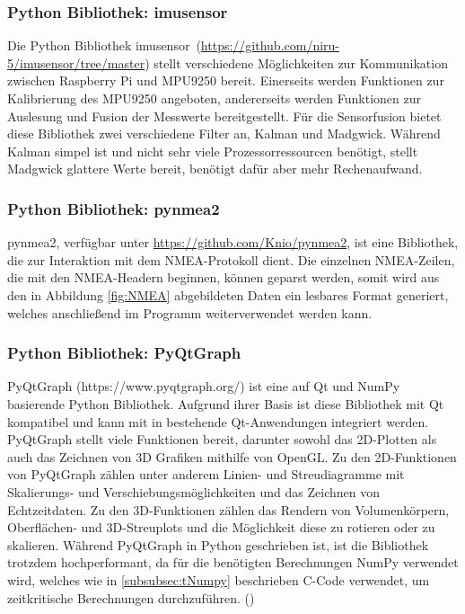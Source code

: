 \subsubsection{Python Bibliothek: imusensor}
\label{subsubsec:tLibImusensor}
Die Python Bibliothek \glqq imusensor\grqq\ (\url{https://github.com/niru-5/imusensor/tree/master}) stellt verschiedene Möglichkeiten zur Kommunikation zwischen Raspberry Pi und MPU9250 bereit. Einerseits werden Funktionen zur Kalibrierung des MPU9250 angeboten, andererseits werden Funktionen zur Auslesung und Fusion der Messwerte bereitgestellt. Für die Sensorfusion bietet diese Bibliothek zwei verschiedene Filter an, Kalman und Madgwick. Während Kalman simpel ist und nicht sehr viele Prozessorressourcen benötigt, stellt Madgwick glattere Werte bereit, benötigt dafür aber mehr Rechenaufwand.

\subsubsection{Python Bibliothek: pynmea2}
\label{subsubsec:tpynmea2}
pynmea2, verfügbar unter \url{https://github.com/Knio/pynmea2}, ist eine Bibliothek, die zur Interaktion mit dem \ac{NMEA}-Protokoll dient. Die einzelnen \ac{NMEA}-Zeilen, die mit den \ac{NMEA}-Headern beginnen, können geparst werden, somit wird aus den in Abbildung \ref{fig:NMEA} abgebildeten Daten ein lesbares Format generiert, welches anschließend im Programm weiterverwendet werden kann.

\subsubsection{Python Bibliothek: PyQtGraph}
\label{subsubsec:tPyQtGraph}
PyQtGraph (https://www.pyqtgraph.org/) ist eine auf Qt und NumPy basierende Python Bibliothek. Aufgrund ihrer Basis ist diese Bibliothek mit Qt kompatibel und kann mit in bestehende Qt-Anwendungen integriert werden. PyQtGraph stellt viele Funktionen bereit, darunter sowohl das \ac{2D}-Plotten als auch das Zeichnen von \ac{3D} Grafiken mithilfe von OpenGL. Zu den \ac{2D}-Funktionen von PyQtGraph zählen unter anderem Linien- und Streudiagramme mit Skalierungs- und Verschiebungsmöglichkeiten und das Zeichnen von Echtzeitdaten. Zu den \ac{3D}-Funktionen zählen das Rendern von Volumenkörpern, Oberflächen- und \ac{3D}-Streuplots und die Möglichkeit diese zu rotieren oder zu skalieren. Während PyQtGraph in Python geschrieben ist, ist die Bibliothek trotzdem hochperformant, da für die benötigten Berechnungen NumPy verwendet wird, welches wie in \ref{subsubsec:tNumpy} beschrieben C-Code verwendet, um zeitkritische Berechnungen durchzuführen.
(\cite{PyQtGraphDocs})

